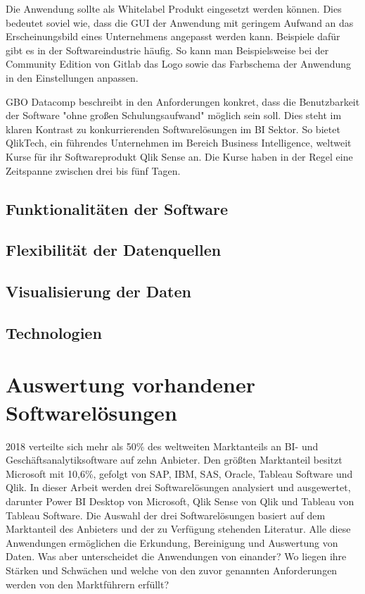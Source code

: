 Die Anwendung sollte als Whitelabel Produkt eingesetzt werden können. Dies bedeutet soviel wie,
dass die GUI der Anwendung mit geringem Aufwand an das Erscheinungsbild eines Unternehmens angepasst
werden kann. Beispiele dafür gibt es in der Softwareindustrie häufig. So kann man Beispielsweise bei
der Community Edition von Gitlab das Logo sowie das Farbschema der Anwendung in den Einstellungen
anpassen.\cite{GitlabDocs}

GBO Datacomp beschreibt in den Anforderungen konkret, dass die Benutzbarkeit der Software
"ohne großen Schulungsaufwand" möglich sein soll. \cite{GBODatacompHandbuchDashboard}
Dies steht im klaren Kontrast zu konkurrierenden Softwarelösungen im BI Sektor.
So bietet QlikTech, ein führendes Unternehmen im Bereich Business Intelligence,
weltweit Kurse für ihr Softwareprodukt Qlik Sense an. Die Kurse haben in der
Regel eine Zeitspanne zwischen drei bis fünf Tagen.\cite{QlikSenseTraining}


\subsection{Funktionalitäten der Software}

\subsection{Flexibilität der Datenquellen}

\subsection{Visualisierung der Daten}

\subsection{Technologien}

\section{Auswertung vorhandener Softwarelösungen}
2018 verteilte sich mehr als 50\% des weltweiten Marktanteils an BI- und Geschäftsanalytiksoftware auf
zehn Anbieter. Den größten Marktanteil besitzt Microsoft mit 10,6\%, gefolgt von SAP, IBM, SAS, Oracle,
Tableau Software und Qlik.\cite{StatistaMarketshareBI}
In dieser Arbeit werden drei Softwarelösungen analysiert und ausgewertet, darunter Power BI Desktop von
Microsoft, Qlik Sense von Qlik und Tableau von Tableau Software. Die Auswahl der drei Softwarelösungen
basiert auf dem Marktanteil des Anbieters und der zu Verfügung stehenden Literatur. Alle diese 
Anwendungen ermöglichen die Erkundung, Bereinigung und Auswertung von Daten. Was aber unterscheidet
die Anwendungen von einander? Wo liegen ihre Stärken und Schwächen und welche von den zuvor genannten
Anforderungen werden von den Marktführern erfüllt?

